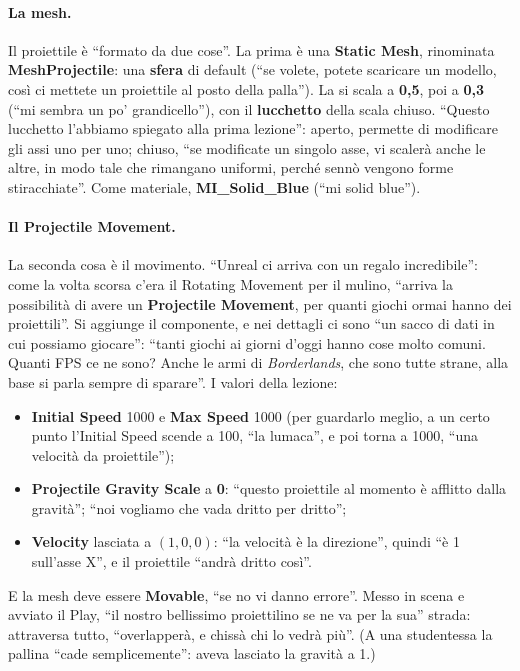 \paragraph{La mesh.} Il proiettile è ``formato da due cose''. La prima è una \textbf{Static
Mesh}, rinominata \textbf{MeshProjectile}: una \textbf{sfera} di default (``se volete,
potete scaricare un modello, così ci mettete un proiettile al posto della palla'').
La si scala a \textbf{0,5}, poi a \textbf{0,3} (``mi sembra un po' grandicello''),
con il \textbf{lucchetto} della scala chiuso. ``Questo lucchetto l'abbiamo spiegato alla
prima lezione'': aperto, permette di modificare gli assi uno per uno; chiuso, ``se
modificate un singolo asse, vi scalerà anche le altre, in modo tale che rimangano
uniformi, perché sennò vengono forme stiracchiate''. Come materiale, \textbf{MI\_Solid\_Blue}
(``mi solid blue'').

\paragraph{Il Projectile Movement.} La seconda cosa è il movimento. ``Unreal ci arriva
con un regalo incredibile'': come la volta scorsa c'era il Rotating Movement per il
mulino, ``arriva la possibilità di avere un \textbf{Projectile Movement}, per quanti
giochi ormai hanno dei proiettili''. Si aggiunge il componente, e nei dettagli ci sono
``un sacco di dati in cui possiamo giocare'': ``tanti giochi ai giorni d'oggi hanno cose
molto comuni. Quanti FPS ce ne sono? Anche le armi di \emph{Borderlands}, che sono tutte
strane, alla base si parla sempre di sparare''. I valori della lezione:
\begin{itemize}
  \item \textbf{Initial Speed} 1000 e \textbf{Max Speed} 1000 (per guardarlo meglio, a
        un certo punto l'Initial Speed scende a 100, ``la lumaca'', e poi torna a 1000,
        ``una velocità da proiettile'');
  \item \textbf{Projectile Gravity Scale} a \textbf{0}: ``questo proiettile al momento
        è afflitto dalla gravità''; ``noi vogliamo che vada dritto per dritto'';
  \item \textbf{Velocity} lasciata a $(1, 0, 0)$: ``la velocità è la direzione'',
        quindi ``è 1 sull'asse X'', e il proiettile ``andrà dritto così''.
\end{itemize}
E la mesh deve essere \textbf{Movable}, ``se no vi danno errore''. Messo in scena e
avviato il Play, ``il nostro bellissimo proiettilino se ne va per la sua'' strada:
attraversa tutto, ``overlapperà, e chissà chi lo vedrà più''. (A una studentessa la
pallina ``cade semplicemente'': aveva lasciato la gravità a 1.)

